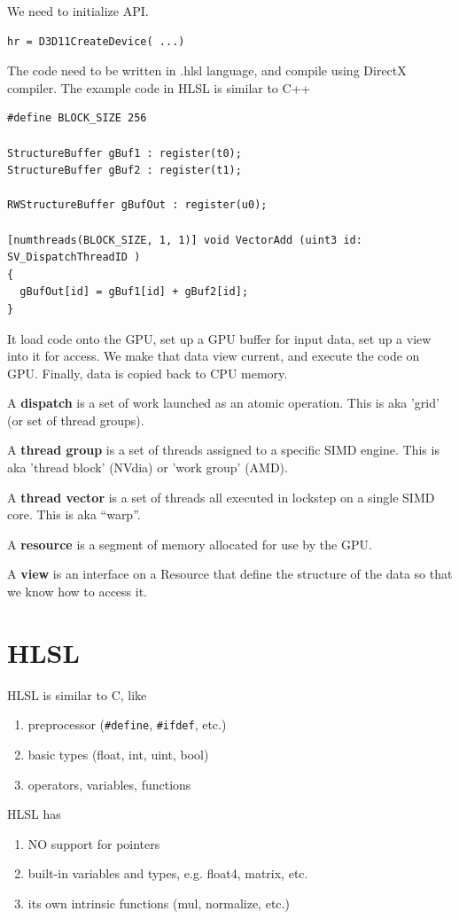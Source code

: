 We need to initialize API.
\begin{verbatim}
hr = D3D11CreateDevice( ...)
\end{verbatim}
The code need to be written in .hlsl language, and compile using DirectX
compiler. The example code in HLSL is similar to C++
\begin{verbatim}
#define BLOCK_SIZE 256

StructureBuffer gBuf1 : register(t0);
StructureBuffer gBuf2 : register(t1);

RWStructureBuffer gBufOut : register(u0);

[numthreads(BLOCK_SIZE, 1, 1)] void VectorAdd (uint3 id: SV_DispatchThreadID )
{
  gBufOut[id] = gBuf1[id] + gBuf2[id];
}
\end{verbatim}
It load code onto the GPU, set up a GPU buffer for input data, set up a view
into it for access. We make that data view current, and execute the code on GPU.
Finally, data is copied back to CPU memory. 

\begin{framed}
A {\bf dispatch} is a set of work launched as an atomic operation. This is aka
'grid' (or set of thread groups).

A {\bf thread group} is a set of threads assigned to a specific SIMD engine.
This is aka 'thread block' (NVdia) or 'work group' (AMD).

A {\bf thread vector} is a set of threads all executed in lockstep on a single
SIMD core. This is aka ``warp''. 

A {\bf resource} is a segment of memory allocated for use by the GPU.

A {\bf view} is an interface on a Resource that define the structure of the data
so that we know how to access it.
\end{framed}

\section{HLSL}

HLSL is similar to C, like
\begin{enumerate}
  \item preprocessor (\verb!#define!, \verb!#ifdef!, etc.)
  \item basic types (float, int, uint, bool)
  \item operators, variables, functions
\end{enumerate}

HLSL has 
\begin{enumerate}
  \item NO support for pointers
  \item built-in variables and types, e.g. float4, matrix, etc.
  \item its own intrinsic functions (mul, normalize, etc.)
\end{enumerate}

